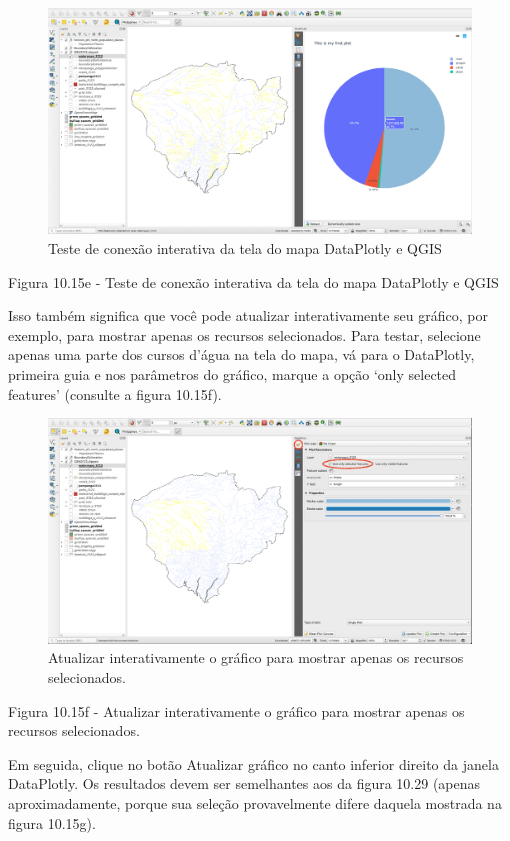 \documentclass[
]{krantz}
\begin{document}
\begin{figure}
\centering
\includegraphics{media/modulo10/fig1015_e.png}
\caption{Teste de conexão interativa da tela do mapa DataPlotly e QGIS}
\end{figure}

Figura 10.15e - Teste de conexão interativa da tela do mapa DataPlotly e QGIS

Isso também significa que você pode atualizar interativamente seu gráfico, por exemplo, para mostrar apenas os recursos selecionados. Para testar, selecione apenas uma parte dos cursos d'água na tela do mapa, vá para o DataPlotly, primeira guia e nos parâmetros do gráfico, marque a opção `only selected features' (consulte a figura 10.15f).

\begin{figure}
\centering
\includegraphics{media/modulo10/fig1015_f.png}
\caption{Atualizar interativamente o gráfico para mostrar apenas os recursos selecionados.}
\end{figure}

Figura 10.15f - Atualizar interativamente o gráfico para mostrar apenas os recursos selecionados.

Em seguida, clique no botão Atualizar gráfico no canto inferior direito da janela DataPlotly. Os resultados devem ser semelhantes aos da figura 10.29 (apenas aproximadamente, porque sua seleção provavelmente difere daquela mostrada na figura 10.15g).
\end{document}
